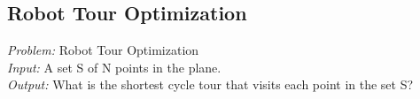 \subsection{Robot Tour Optimization}

\emph{Problem:} Robot Tour Optimization \\
\emph{Input:} A set S of N points in the plane. \\
\emph{Output:} What is the shortest cycle tour that visits each point in the set S?\\
